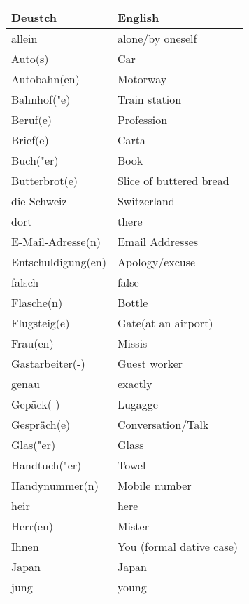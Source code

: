 \documentclass{article}
\renewcommand{\arraystretch}{1}
\begin{document}
\begin{minipage}{0.48\textwidth}
    \centering
    \renewcommand{\arraystretch}{1.5}
    \begin{tabular}{|>{\raggedright\arraybackslash}p{3.5cm}|>{\raggedright\arraybackslash}p{3.5cm}|}
        \hline
        \rowcolor{gray!20} \textbf{Deustch} & \textbf{English} \\
        \hline
        allein & alone/by oneself \\\hline
        Auto(s) & Car \\\hline
        Autobahn(en) & Motorway \\\hline
        Bahnhof("e) & Train station \\\hline
        Beruf(e) & Profession \\\hline
        Brief(e) & Carta \\\hline
        Buch("er) & Book \\\hline
        Butterbrot(e) & Slice of buttered bread \\\hline
        die Schweiz & Switzerland \\\hline
        dort & there \\\hline
        E-Mail-Adresse(n) & Email Addresses \\\hline
        Entschuldigung(en) & Apology/excuse \\\hline
        falsch & false \\\hline
        Flasche(n) & Bottle \\\hline
        Flugsteig(e) & Gate(at an airport) \\\hline
        Frau(en) & Missis \\\hline
        Gastarbeiter(-) & Guest worker \\\hline
        genau & exactly \\\hline
        Gepäck(-) & Lugagge \\\hline
        Gespräch(e) & Conversation/Talk \\\hline
        Glas("er) & Glass \\\hline
        Handtuch("er) & Towel \\\hline
        Handynummer(n) & Mobile number \\\hline
        heir & here \\\hline
        Herr(en) & Mister \\\hline
        Ihnen & You (formal dative case) \\\hline
        Japan & Japan \\\hline
        jung & young \\\hline
    \end{tabular}
\end{minipage}%
\end{document}
